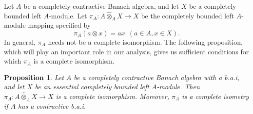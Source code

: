 \documentclass[10pt]{amsart}
\newtheorem{prop}[thm]{Proposition}
\numberwithin{thm}{section}
\numberwithin{equation}{section}
\begin{document}
Let $A$ be a completely contractive Banach algebra, and let $X$ be a completely 
bounded left $A$-module. Let $\pi_A : A\widehat{\otimes}_A X \to X$ be the completely 
bounded left $A$-module mapping specified by 
$$\pi_A(a\otimes x)=ax \ \ (a\in A, x\in X).$$
In general, $\pi_A$ needs not be a complete isomorphism. The following proposition, which 
will play an important role in our analysis, 
gives us sufficient conditions for which $\pi_A$ is a complete isomorphism.  

\begin{prop}
Let $A$ be a completely contractive Banach algebra with a b.a.i, and let $X$ be an essential completely 
bounded left $A$-module.
Then $\pi_A : A\widehat{\otimes}_A X \to X$ is a complete isomorphism. Moreover, $\pi_A$ is a complete 
isometry if $A$ has a contractive b.a.i.  
\end{prop}
\end{document}
